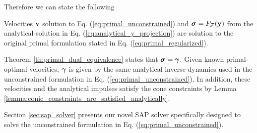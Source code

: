 Therefore we can state the following
\begin{theorem}
    Velocities ${\mathbf{v}}$ solution to Eq. (\ref{eq:primal_unconstrained}) and
    ${\bm\sigma}=P_\mathcal{F}({\mathbf{y}})$ from the analytical solution in Eq.
    (\ref{eq:analytical_y_projection}) are solution to the original primal
    formulation stated in Eq. (\ref{eq:primal_regularized}).
\end{theorem}
\begin{IEEEproof}
    Theorem \ref{th:primal_dual_equivalence} states that ${\bm\sigma}={\bm\gamma}$.
    Given known primal-optimal velocities, ${\bm\gamma}$ is given by the same
    analytical inverse dynamics used in the unconstrained formulation in Eq.
    (\ref{eq:primal_unconstrained}).
    In addition, these velocities and the analytical impulses satisfy the cone
    constraints by Lemma \ref{lemma:conic_constraints_are_satisfied_analytically}.
\end{IEEEproof}

Section \ref{sec:sap_solver} presents our novel SAP  solver
specifically designed to solve the unconstrained formulation in Eq. (\ref{eq:primal_unconstrained}).


